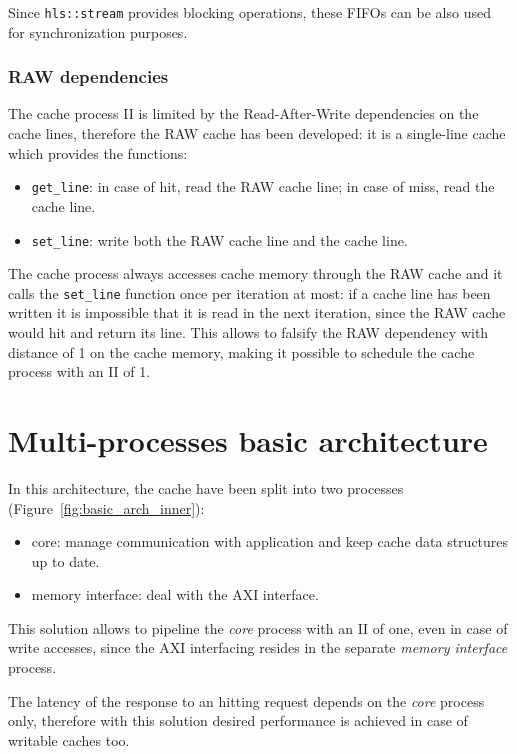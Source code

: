 \documentclass[11pt,a4paper]{memoir}
\begin{document}
Since \texttt{hls::stream} provides blocking operations, these FIFOs can be also
used for synchronization purposes.

\subsubsection{RAW dependencies}
The cache process II is limited by the Read-After-Write dependencies on the
cache lines, therefore the RAW cache has been developed: it is a single-line
cache which provides the functions:
\begin{itemize}
	\item \texttt{get\_line}: in case of hit, read the RAW cache line;
		in case of miss, read the cache line.
	\item \texttt{set\_line}: write both the RAW cache line and the cache
		line.
\end{itemize}

The cache process always accesses cache memory through the RAW cache and it
calls the \texttt{set\_line} function once per iteration at most: if a cache
line has been written it is impossible that it is read in the next iteration,
since the RAW cache would hit and return its line. This allows to falsify the
RAW dependency with distance of 1 on the cache memory, making it possible to
schedule the cache process with an II of 1.

\section{Multi-processes basic architecture}
In this architecture, the cache have been split into two processes
(Figure~\ref{fig:basic_arch_inner}):
\begin{itemize}
	\item core: manage communication with application and keep cache data
		structures up to date.
	\item memory interface: deal with the AXI interface.
\end{itemize}

This solution allows to pipeline the \emph{core} process with an II of one, even
in case of write accesses, since the AXI interfacing resides in the separate
\emph{memory interface} process.

The latency of the response to an hitting request depends on the \emph{core}
process only, therefore with this solution desired performance is achieved in
case of writable caches too.
\end{document}
